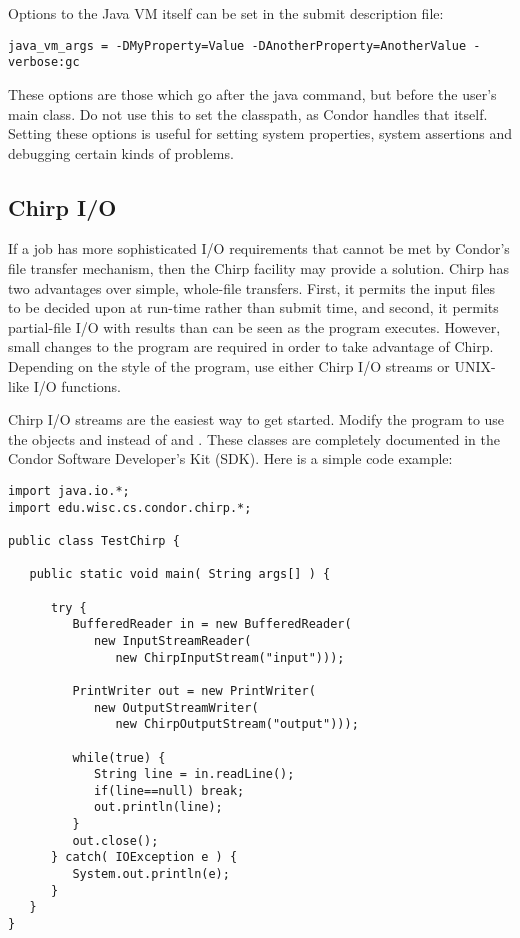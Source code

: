 Options to the Java VM itself can be set in the 
submit description file:

\begin{verbatim}
java_vm_args = -DMyProperty=Value -DAnotherProperty=AnotherValue -verbose:gc
\end{verbatim}

These options are those which go after the java command, but before
the user's main class.  Do not use this to set the classpath, as
Condor handles that itself.  Setting these options is useful for
setting system properties, system assertions and debugging certain
kinds of problems.

\subsection{Chirp I/O}

If a job has more sophisticated I/O requirements that cannot
be met by Condor's file transfer mechanism,
then the Chirp facility may provide a solution.
Chirp has two advantages over simple, whole-file transfers.
First, it permits the input files to be decided upon at run-time
rather than submit time, and second,
it permits partial-file I/O with results than can be seen as the
program executes.
However, small changes to the program are required
in order to take advantage of Chirp.
Depending on the style of the program, use either Chirp I/O streams
or UNIX-like I/O functions.

Chirp I/O streams are the easiest way to get started.
Modify the program to use the objects 
and  instead of  and
.
These classes are completely documented
in the Condor Software Developer's Kit (SDK).
Here is a simple code example:

\begin{verbatim}
import java.io.*;
import edu.wisc.cs.condor.chirp.*;

public class TestChirp {

   public static void main( String args[] ) {

      try {
         BufferedReader in = new BufferedReader(
            new InputStreamReader(
               new ChirpInputStream("input")));

         PrintWriter out = new PrintWriter(
            new OutputStreamWriter(
               new ChirpOutputStream("output")));

         while(true) {
            String line = in.readLine();
            if(line==null) break;
            out.println(line);
         }
         out.close();
      } catch( IOException e ) {
         System.out.println(e);
      }
   }
}
\end{verbatim}

